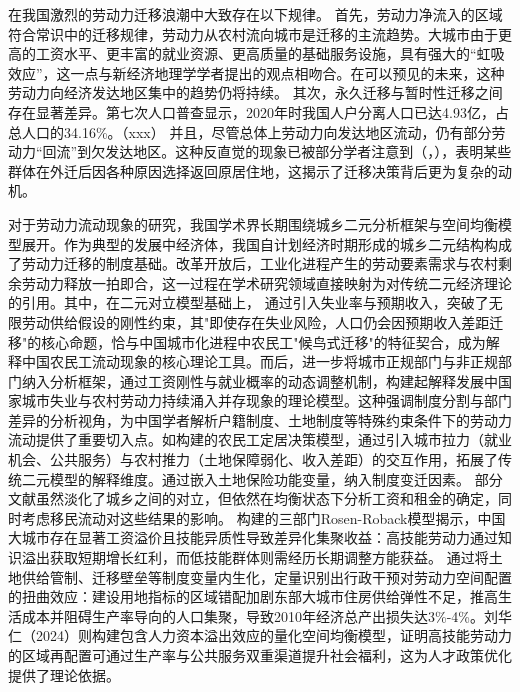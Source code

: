\documentclass[a4paper,12pt]{article}
\begin{document}
在我国激烈的劳动力迁移浪潮中大致存在以下规律。
首先，劳动力净流入的区域符合常识中的迁移规律，劳动力从农村流向城市是迁移的主流趋势。大城市由于更高的工资水平、更丰富的就业资源、更高质量的基础服务设施，具有强大的“虹吸效应”，这一点与新经济地理学学者提出的观点相吻合。在可以预见的未来，这种劳动力向经济发达地区集中的趋势仍将持续。
其次，永久迁移与暂时性迁移之间存在显著差异。第七次人口普查显示，2020年时我国人户分离人口已达4.93亿，占总人口的34.16\%。（xxx）
并且，尽管总体上劳动力向发达地区流动，仍有部分劳动力“回流”到欠发达地区。这种反直觉的现象已被部分学者注意到（\cite{ShiZhiLeiJiaTingBingFuJiaTingJueCeYuNongCunQianYiLaoDongLiHuiLiu2012}，\cite{RenYuanNongCunWaiChuLaoDongLiHuiLiuQianYiDeYingXiangYinSuHeHuiLiuXiaoYing2017}），表明某些群体在外迁后因各种原因选择返回原居住地，这揭示了迁移决策背后更为复杂的动机。

对于劳动力流动现象的研究，我国学术界长期围绕城乡二元分析框架与空间均衡模型展开。作为典型的发展中经济体，我国自计划经济时期形成的城乡二元结构构成了劳动力迁移的制度基础。改革开放后，工业化进程产生的劳动要素需求与农村剩余劳动力释放一拍即合，这一过程在学术研究领域直接映射为对传统二元经济理论的引用。其中，在\cite{lewisEconomicDevelopmentUnlimited1954}二元对立模型基础上，
\cite{todaroModelLaborMigration1969}通过引入失业率与预期收入，突破了无限劳动供给假设的刚性约束，其"即使存在失业风险，人口仍会因预期收入差距迁移"的核心命题，恰与中国城市化进程中农民工"候鸟式迁移"的特征契合，成为解释中国农民工流动现象的核心理论工具。而后，\cite{harrisMigrationUnemploymentDevelopment1970}进一步将城市正规部门与非正规部门纳入分析框架，通过工资刚性与就业概率的动态调整机制，构建起解释发展中国家城市失业与农村劳动力持续涌入并存现象的理论模型。这种强调制度分割与部门差异的分析视角，为中国学者解析户籍制度、土地制度等特殊约束条件下的劳动力流动提供了重要切入点。如\cite{XiongCaiYunNongMinGongChengShiDingJuZhuanYiJueCeYinSuDeTuiLaMoXingJiShiZhengFenXi2007}构建的农民工定居决策模型，通过引入城市拉力（就业机会、公共服务）与农村推力（土地保障弱化、收入差距）的交互作用，拓展了传统二元模型的解释维度。\cite{HuangZhongHuaNongCunTuDiZhiDuAnPaiShiFouZuAiNongMinGongShiMinHuaTuoDaLuoMoXingTuoZhanHeYiWuShiShiZhengFenXi2014}通过嵌入土地保险功能变量，\cite{ZhongShuiYingXiangChengRenKouLiuDongDeLiLunJieShiNongCunRenKouTuiChuShiJiaoTuoDaLuoMoXingDeZaiXiuZheng2015}纳入制度变迁因素。
部分文献虽然淡化了城乡之间的对立，但依然在均衡状态下分析工资和租金的确定，同时考虑移民流动对这些结果的影响。
\cite{ZongJiaFengDaChengShiZhiFuLiaoGengGaoDeGongZiMa2015}构建的三部门Rosen-Roback模型揭示，中国大城市存在显著工资溢价且技能异质性导致差异化集聚收益：高技能劳动力通过知识溢出获取短期增长红利，而低技能群体则需经历长期调整方能获益。
\cite{WangLiLiWoGuoRenKouQianYiChengBenChengShiGuiMoYuShengChanLu2020,WangLiLiTuDiGongGeiFangJieYuLaoDongLiKongJianPeiZhiXiaoLu2023,WangLiLiLaoDongLiLiuDongDuiChengShiGongZiYuFuLiDeYingXiangJiYuKongJianJunHengMoXingDeFenXi2024}通过将土地供给管制、迁移壁垒等制度变量内生化，定量识别出行政干预对劳动力空间配置的扭曲效应：建设用地指标的区域错配加剧东部大城市住房供给弹性不足，推高生活成本并阻碍生产率导向的人口集聚，导致2010年经济总产出损失达3\%-4\%。刘华仁（2024）则构建包含人力资本溢出效应的量化空间均衡模型，证明高技能劳动力的区域再配置可通过生产率与公共服务双重渠道提升社会福利，这为人才政策优化提供了理论依据。
\end{document}
